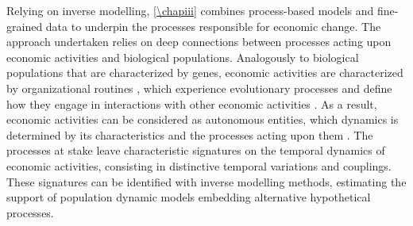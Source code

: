 % 
Relying on inverse modelling, \cref{\chapiii} combines process-based models and fine-grained data to underpin the processes responsible for economic change.
% 
The approach undertaken relies on deep connections between processes acting upon economic activities and biological populations.
% 
Analogously to biological populations that are characterized by genes, economic activities are characterized by organizational routines \citep{NelsonWinter}, which experience evolutionary processes and define how they engage in interactions with other economic activities \citep{NelsonWinter}.
% 
% 
As a result, economic activities can be considered as autonomous entities, which dynamics is determined by its characteristics and the processes acting upon them \citep{Boschma2005a}.
% 
The processes at stake leave characteristic signatures on the temporal dynamics of economic activities, consisting in distinctive temporal variations and couplings.
% 
These signatures can be identified with inverse modelling methods, estimating the support of population dynamic models embedding alternative hypothetical processes. %

